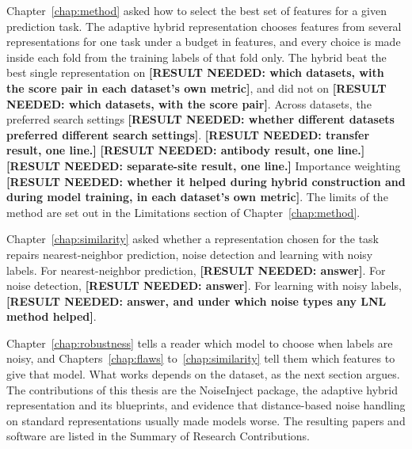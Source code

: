 Chapter~\ref{chap:method} asked how to select the best set of features for a given prediction task. The adaptive hybrid representation chooses features from several representations for one task under a budget in features, and every choice is made inside each fold from the training labels of that fold only. The hybrid beat the best single representation on \textbf{[RESULT NEEDED: which datasets, with the score pair in each dataset's own metric]}, and did not on \textbf{[RESULT NEEDED: which datasets, with the score pair]}. Across datasets, the preferred search settings \textbf{[RESULT NEEDED: whether different datasets preferred different search settings]}. \textbf{[RESULT NEEDED: transfer result, one line.]} \textbf{[RESULT NEEDED: antibody result, one line.]} \textbf{[RESULT NEEDED: separate-site result, one line.]} Importance weighting \textbf{[RESULT NEEDED: whether it helped during hybrid construction and during model training, in each dataset's own metric]}. The limits of the method are set out in the Limitations section of Chapter~\ref{chap:method}.

Chapter~\ref{chap:similarity} asked whether a representation chosen for the task repairs nearest-neighbor prediction, noise detection and learning with noisy labels. For nearest-neighbor prediction, \textbf{[RESULT NEEDED: answer]}. For noise detection, \textbf{[RESULT NEEDED: answer]}. For learning with noisy labels, \textbf{[RESULT NEEDED: answer, and under which noise types any LNL method helped]}.

Chapter~\ref{chap:robustness} tells a reader which model to choose when labels are noisy, and Chapters~\ref{chap:flaws} to~\ref{chap:similarity} tell them which features to give that model. What works depends on the dataset, as the next section argues. The contributions of this thesis are the NoiseInject package, the adaptive hybrid representation and its blueprints, and evidence that distance-based noise handling on standard representations usually made models worse. The resulting papers and software are listed in the Summary of Research Contributions.




